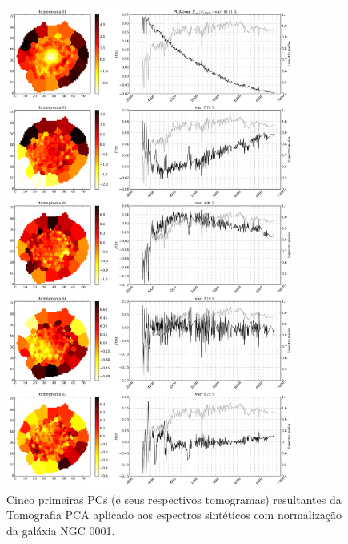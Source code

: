 \begin{figure}
    \includegraphics[width=0.85\textwidth]{figuras/K0008-tomo-syn-norm.pdf}
    \caption[Tomogramas de 1 a 5 para o cubo $F_{syn}$ norm. - NGC 0001.]
    {Cinco primeiras PCs (e seus respectivos tomogramas) resultantes da Tomografia PCA aplicado aos espectros
    sintéticos com normalização da galáxia NGC 0001.}
    \label{fig:K0008tomofsynnorm}
\end{figure}

